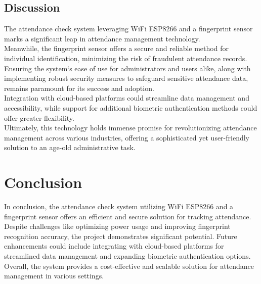 \documentclass[conference, doublecolumn]{IEEEtran}
\begin{document}
\subsection{Discussion}The attendance check system leveraging WiFi ESP8266 and a fingerprint sensor marks a significant leap in attendance management technology.\\
Meanwhile, the fingerprint sensor offers a secure and reliable method for individual identification, minimizing the risk of fraudulent attendance records.\\
Ensuring the system`s ease of use for administrators and users alike, along with implementing robust security measures to safeguard sensitive attendance data, remains paramount for its success and adoption.\\
Integration with cloud-based platforms could streamline data management and accessibility, while support for additional biometric authentication methods could offer greater flexibility.\\
Ultimately, this technology holds immense promise for revolutionizing attendance management across various industries, offering a sophisticated yet user-friendly solution to an age-old administrative task.

\section{\textbf{Conclusion}}
In conclusion, the attendance check system utilizing WiFi ESP8266 and a fingerprint sensor offers an efficient and secure solution for tracking attendance. Despite challenges like optimizing power usage and improving fingerprint recognition accuracy, the project demonstrates significant potential. Future enhancements could include integrating with cloud-based platforms for streamlined data management and expanding biometric authentication options. Overall, the system provides a cost-effective and scalable solution for attendance management in various settings.\cite{iotdesignpro}\cite{electroniclinic}




\end{document}
